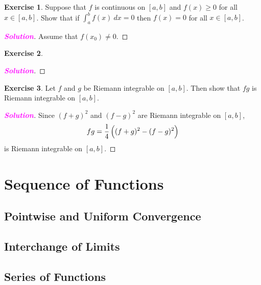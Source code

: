 \documentclass[12pt,openany]{book}
\theoremstyle{definition}
\newtheorem{exercise}{Exercise}[chapter]
\newcommand{\sol}{\textcolor{magenta}{\bf Solution}}
\begin{document}
	\vspace{15pt}
	\begin{tcolorbox}[colframe=execolor, title={\color{white}\bf}]
		\begin{exercise}
			Suppose that $f$ is continuous on $[a,b]$ and $f(x)\geq 0$ for all $x\in[a,b]$. Show that if $\int_a^bf(x)\ dx = 0$ then $f(x)=0$ for all $x\in[a,b]$.
		\end{exercise}
	\end{tcolorbox}
	\begin{proof}[\sol]
		Assume that $f(x_0)\neq 0$.
	\end{proof}
	\vspace{15pt}
	\begin{tcolorbox}[colframe=execolor, title={\color{white}\bf}]
		\begin{exercise}
			
		\end{exercise}
	\end{tcolorbox}
	\begin{proof}[\sol]
		
	\end{proof}
	\vspace{15pt}
	\begin{tcolorbox}[colframe=execolor, title={\color{white}\bf}]
		\begin{exercise}
			Let $f$ and $g$ be Riemann integrable on $[a,b]$. Then show that $fg$ is Riemann integrable on $[a,b]$.
		\end{exercise}
	\end{tcolorbox}
	\begin{proof}[\sol]
		Since $(f+g)^2$ and $(f-g)^2$ are Riemann integrable on $[a,b]$, \[
		fg=\frac{1}{4}\del{(f+g)^2-(f-g)^2}
		\] is Riemann integrable on $[a,b]$.
	\end{proof}

	\newpage
	\chapter{Sequence of Functions}
	\section{Pointwise and Uniform Convergence}
	\section{Interchange of Limits}
	\section{Series of Functions}
\end{document}
